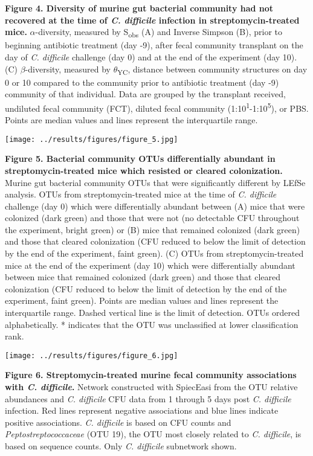 \documentclass[
  12pt,
]{article}
\begin{document}
\textbf{Figure 4. Diversity of murine gut bacterial community had not
recovered at the time of \emph{C. difficile} infection in
streptomycin-treated mice.} \(\alpha\)-diversity, measured by
S\textsubscript{obs} (A) and Inverse Simpson (B), prior to beginning
antibiotic treatment (day -9), after fecal community transplant on the
day of \emph{C. difficile} challenge (day 0) and at the end of the
experiment (day 10). (C) \(\beta\)-diversity, measured by
\(\theta\)\textsubscript{YC}, distance between community structures on
day 0 or 10 compared to the community prior to antibiotic treatment (day
-9) community of that individual. Data are grouped by the transplant
received, undiluted fecal community (FCT), diluted fecal community
(1:10\textsuperscript{1}-1:10\textsuperscript{5}), or PBS. Points are
median values and lines represent the interquartile range.

\hfill\break

\texttt{[image: ../results/figures/figure\_5.jpg]}

\textbf{Figure 5. Bacterial community OTUs differentially abundant in
streptomycin-treated mice which resisted or cleared colonization.}
Murine gut bacterial community OTUs that were significantly different by
LEfSe analysis. OTUs from streptomycin-treated mice at the time of
\emph{C. difficile} challenge (day 0) which were differentially abundant
between (A) mice that were colonized (dark green) and those that were
not (no detectable CFU throughout the experiment, bright green) or (B)
mice that remained colonized (dark green) and those that cleared
colonization (CFU reduced to below the limit of detection by the end of
the experiment, faint green). (C) OTUs from streptomycin-treated mice at
the end of the experiment (day 10) which were differentially abundant
between mice that remained colonized (dark green) and those that cleared
colonization (CFU reduced to below the limit of detection by the end of
the experiment, faint green). Points are median values and lines
represent the interquartile range. Dashed vertical line is the limit of
detection. OTUs ordered alphabetically. * indicates that the OTU was
unclassified at lower classification rank.

\hfill\break

\texttt{[image: ../results/figures/figure\_6.jpg]}

\textbf{Figure 6. Streptomycin-treated murine fecal community
associations with \emph{C. difficile}.} Network constructed with
SpiecEasi from the OTU relative abundances and \emph{C. difficile} CFU
data from 1 through 5 days post \emph{C. difficile} infection. Red lines
represent negative associations and blue lines indicate positive
associations. \emph{C. difficile} is based on CFU counts and
\emph{Peptostreptococcaceae} (OTU 19), the OTU most closely related to
\emph{C. difficile}, is based on sequence counts. Only \emph{C.
difficile} subnetwork shown.
\end{document}
